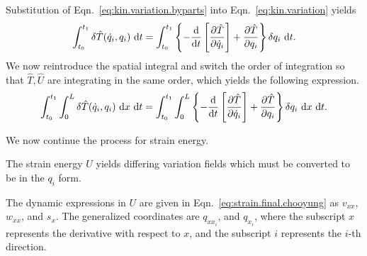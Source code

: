 Substitution of Eqn.~\ref{eq:kin.variation.byparts} into Eqn.~\ref{eq:kin.variation} yields
\begin{equation}
\int_{t_0}^{t_1}\delta\hat T(\dot q_i,q_i)\text{ d}t = \int_{t_0}^{t_1}\left\lbrace-\frac{\text d}{\text dt}\left[\frac{\partial\hat T}{\partial \dot q_i}\right]+\frac{\partial\hat T}{\partial q_i}\right\rbrace\delta q_i\text{ d}t.
\end{equation}
We now reintroduce the spatial integral and switch the order of integration so that $\hat T,\hat U$ are integrating in the same order, which yields the following expression.
\begin{equation}
\int_{t_0}^{t_1}\int_0^L\delta\hat T(\dot q_i,q_i)\text{ d}x\text{ d}t = \int_{t_0}^{t_1}\int_0^L\left\lbrace-\frac{\text d}{\text dt}\left[\frac{\partial\hat T}{\partial \dot q_i}\right]+\frac{\partial\hat T}{\partial q_i}\right\rbrace\delta q_i\text{ d}x\text{ d}t.
\end{equation}

We now continue the process for strain energy.

The strain energy $U$ yields differing variation fields which must be converted to be in the $q_i$ form.

The dynamic expressions in $U$ are given in Eqn.~\ref{eq:strain.final.chooyung} as $v_{xx}$, $w_{xx}$, and $s_x$. The generalized coordinates are $q_{xx_i}$, and $q_{x_i}$, where the subscript $x$ represents the derivative with respect to $x$, and the subscript $i$ represents the $i$-th direction.

